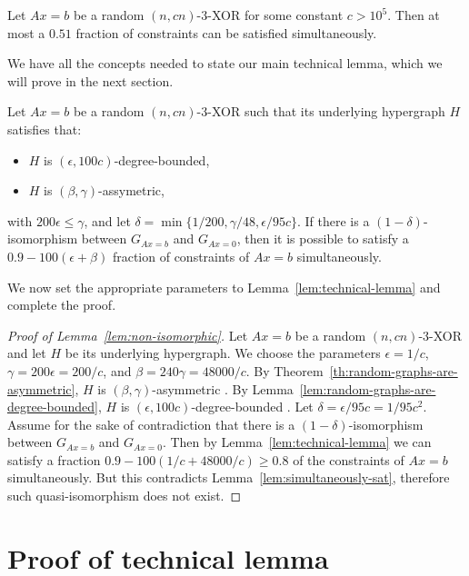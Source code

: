 \documentclass[a4paper,twoside,justified]{tufte-handout}
\newcommand{\Glin}[1]{G_{Ax=#1}}
\begin{document}
\begin{lemma}
  \label{lem:simultaneously-sat}
  Let $Ax=b$ be a random $(n,cn)$-3-XOR for some constant $c > 10^5$. Then at most a $0.51$ fraction of constraints can be satisfied simultaneously.
\end{lemma}

We have all the concepts needed to state our main technical lemma, which we will prove in the next section.

\begin{lemma}
  \label{lem:technical-lemma}
  Let $Ax=b$ be a random $(n,cn)$-3-XOR such that its underlying hypergraph $H$ satisfies that:
  \begin{itemize}
  \item $H$ is $(\epsilon, 100c)$-degree-bounded,
  \item $H$ is $(\beta, \gamma)$-assymetric,
  \end{itemize}
  with $200 \epsilon \leq \gamma$, and let $\delta = \min\{1/200, \gamma/48, \epsilon / 95c\}$. If there is a $(1-\delta)$-isomorphism between $\Glin{b}$ and $\Glin{0}$, then it is possible to satisfy a $0.9 - 100(\epsilon + \beta)$ fraction of constraints of $Ax=b$ simultaneously.
\end{lemma}

We now set the appropriate parameters to Lemma~\ref{lem:technical-lemma} and complete the proof.

\begin{proof}[Proof of Lemma~\ref{lem:non-isomorphic}]
  Let $Ax=b$ be a random $(n,cn)$-3-XOR and let $H$ be its underlying hypergraph. We choose the parameters $\epsilon = 1/c$, $\gamma = 200\epsilon = 200/c$, and $\beta = 240 \gamma = 48000/c$. By Theorem~\ref{th:random-graphs-are-asymmetric}, $H$ is $(\beta,\gamma)$-asymmetric \whp. By Lemma~\ref{lem:random-graphs-are-degree-bounded}, $H$ is $(\epsilon,100c)$-degree-bounded \whp. Let $\delta = \epsilon / 95c = 1/95c^2$. Assume for the sake of contradiction that there is a $(1-\delta)$-isomorphism between $\Glin{b}$ and $\Glin{0}$. Then by Lemma~\ref{lem:technical-lemma} we can satisfy a fraction $0.9-100(1/c+48000/c) \geq 0.8$ of the constraints of $Ax=b$ simultaneously. But this contradicts Lemma~\ref{lem:simultaneously-sat}, therefore such quasi-isomorphism does not exist.
\end{proof}

\section{Proof of technical lemma}
\end{document}
